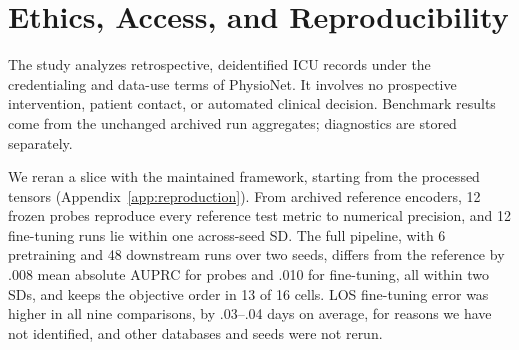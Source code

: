 \section{Ethics, Access, and Reproducibility}
\label{sec:ethics}

The study analyzes retrospective, deidentified ICU records under the credentialing and data-use terms of PhysioNet. It involves no prospective intervention, patient contact, or automated clinical decision. Benchmark results come from the unchanged archived run aggregates; diagnostics are stored separately.

We reran a \MIMIC{} slice with the maintained framework, starting from the processed tensors (Appendix~\ref{app:reproduction}). From archived reference encoders, 12 frozen probes reproduce every reference test metric to numerical precision, and 12 fine-tuning runs lie within one across-seed SD. The full pipeline, with 6 pretraining and 48 downstream runs over two seeds, differs from the reference by .008 mean absolute AUPRC for probes and .010 for fine-tuning, all within two SDs, and keeps the objective order in 13 of 16 cells. LOS fine-tuning error was higher in all nine comparisons, by .03--.04 days on average, for reasons we have not identified, and other databases and seeds were not rerun.
